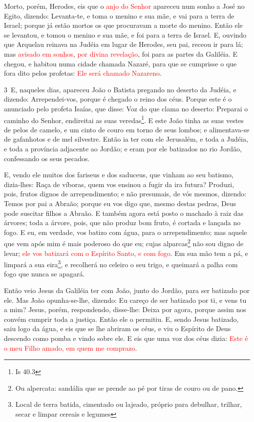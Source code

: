 Morto, porém, Herodes, eis que o \textcolor{red}{anjo do Senhor} apareceu
num sonho a José no Egito, dizendo: Levanta-te, e toma o
menino e sua mãe, e vai para a terra de Israel; porque já estão
mortos os que procuravam a morte do menino. Então ele se
levantou, e tomou o menino e sua mãe, e foi para a terra de Israel.
E, ouvindo que Arquelau reinava na Judéia em lugar de
Herodes, seu pai, receou ir para lá; mas \textcolor{red}{avisado em sonhos},
\textcolor{red}{por divina revelação}, foi para as partes da Galiléia.
E chegou, e habitou numa cidade chamada Nazaré, para que se
cumprisse o que fora dito pelos profetas: \textcolor{red}{Ele será chamado
Nazareno}.

\medskip

\lettrine{3}\ E, naqueles dias, apareceu João o Batista
pregando no deserto da Judéia, e dizendo: Arrependei-vos, porque
é chegado o reino dos céus. Porque este é o anunciado pelo
profeta Isaías, que disse: Voz do que clama no deserto: Preparai o
caminho do Senhor, endireitai as suas veredas\footnote{Is 40.3}.
E este João tinha as suas vestes de pelos de camelo, e um cinto
de couro em torno de seus lombos; e alimentava-se de gafanhotos e de
mel silvestre. Então ia ter com ele Jerusalém, e toda a Judéia,
e toda a província adjacente ao Jordão; e eram por ele batizados
no rio Jordão, confessando os seus pecados.

E, vendo ele muitos dos fariseus e dos saduceus, que vinham ao seu
batismo, dizia-lhes: Raça de víboras, quem vos ensinou a fugir da
ira futura? Produzi, pois, frutos dignos de arrependimento;
e não presumais, de vós mesmos, dizendo: Temos por pai a Abraão;
porque eu vos digo que, mesmo destas pedras, Deus pode suscitar
filhos a Abraão. E também agora está posto o machado à raiz
das árvores; toda a árvore, pois, que não produz bom fruto, é
cortada e lançada no fogo. E eu, em verdade, vos batizo com
água, para o arrependimento; mas aquele que vem após mim é mais
poderoso do que eu; cujas alparcas\footnote{Ou alpercata: sandália
que se prende ao pé por tiras de couro ou de pano.} não sou digno de
levar; \textcolor{red}{ele vos batizará com o Espírito Santo, e com fogo}.
Em sua mão tem a pá, e limpará a sua eira\footnote{Local de
terra batida, cimentado ou lajeado, próprio para debulhar, trilhar,
secar e limpar cereais e legumes }, e recolherá no celeiro o seu
trigo, e queimará a palha com fogo que nunca se apagará.

Então veio Jesus da Galiléia ter com João, junto do Jordão, para
ser batizado por ele. Mas João opunha-se-lhe, dizendo: Eu
careço de ser batizado por ti, e vens tu a mim? Jesus, porém,
respondendo, disse-lhe: Deixa por agora, porque assim nos convém
cumprir toda a justiça. Então ele o permitiu. E, sendo Jesus
batizado, saiu logo da água, e eis que se lhe abriram os céus, e viu
o Espírito de Deus descendo como pomba e vindo sobre ele. E
eis que uma voz dos céus dizia: \textcolor{red}{Este é o meu Filho amado, em
quem me comprazo}.

